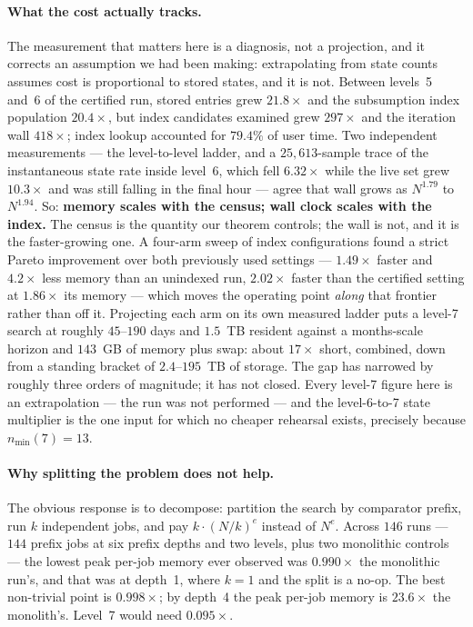 \documentclass[11pt,a4paper]{article}
\theoremstyle{plain}
\theoremstyle{definition}
\theoremstyle{remark}
\newcommand{\nmin}{n_{\min}}
\begin{document}
\paragraph{What the cost actually tracks.}
The measurement that matters here is a diagnosis, not a projection, and it
corrects an assumption we had been making: extrapolating from state counts
assumes cost is proportional to stored states, and it is not. Between levels~5
and~6 of the certified run, stored entries grew $21.8\times$ and the
subsumption index population $20.4\times$, but index candidates examined grew
$297\times$ and the iteration wall $418\times$; index lookup accounted for
$79.4\%$ of user time. Two independent measurements --- the level-to-level
ladder, and a $25{,}613$-sample trace of the instantaneous state rate inside
level~6, which fell $6.32\times$ while the live set grew $10.3\times$ and was
still falling in the final hour --- agree that wall grows as $N^{1.79}$ to
$N^{1.94}$. So: \textbf{memory scales with the census; wall clock scales with
the index.} The census is the quantity our theorem controls; the wall is not,
and it is the faster-growing one. A
four-arm sweep of index configurations found a strict Pareto improvement over
both previously used settings --- $1.49\times$ faster and $4.2\times$ less
memory than an unindexed run, $2.02\times$ faster than the certified setting at
$1.86\times$ its memory --- which moves the operating point \emph{along} that
frontier rather than off it. Projecting each arm on its own measured ladder
puts a level-7 search at roughly $45$--$190$ days and $1.5$~TB resident against
a months-scale horizon and $143$~GB of memory plus swap: about $17\times$
short, combined, down from a standing bracket of $2.4$--$195$~TB of storage.
The gap has narrowed by roughly three orders of magnitude; it has not closed.
Every level-7 figure here is an extrapolation --- the run was not performed ---
and the level-6-to-7 state multiplier is the one input for which no cheaper
rehearsal exists, precisely because $\nmin(7) = 13$.

\paragraph{Why splitting the problem does not help.}
The obvious response is to decompose: partition the search by comparator
prefix, run $k$ independent jobs, and pay $k \cdot (N/k)^{e}$ instead of
$N^{e}$. Across $146$ runs --- $144$ prefix jobs at six prefix depths and two
levels, plus two monolithic controls --- the lowest peak per-job memory ever
observed was $0.990\times$ the monolithic run's, and that was at depth~1, where
$k=1$ and the split is a no-op. The best non-trivial point is $0.998\times$; by
depth~4 the peak per-job memory is $23.6\times$ the monolith's. Level~7 would
need $0.095\times$.
\end{document}
